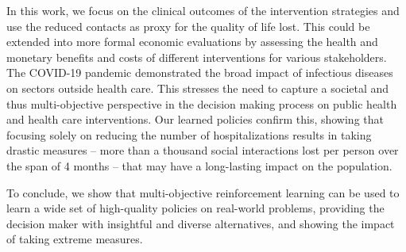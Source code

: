 \documentclass{article}
\begin{document}
In this work, we focus on the clinical outcomes of the intervention strategies and use the reduced contacts as proxy for the quality of life lost. This could be extended into more formal economic evaluations by assessing the health and monetary benefits and costs of different interventions for various stakeholders. The COVID-19 pandemic demonstrated the broad impact of infectious diseases on sectors outside health care. This stresses the need to capture a societal and thus multi-objective perspective in the decision making process on public health and health care interventions. Our learned policies confirm this, showing that focusing solely on reducing the number of hospitalizations results in taking drastic measures -- more than a thousand social interactions lost per person over the span of 4 months -- that may have a long-lasting impact on the population.

To conclude, we show that multi-objective reinforcement learning can be used to learn a wide set of high-quality policies on real-world problems, providing the decision maker with insightful and diverse alternatives, and showing the impact of taking extreme measures.



\end{document}
